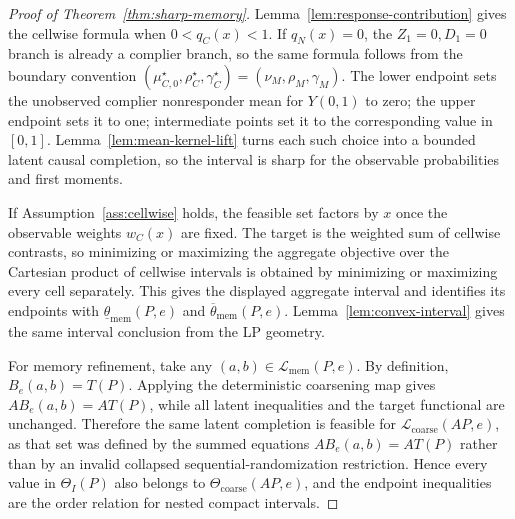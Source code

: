 \documentclass[11pt]{article}
\theoremstyle{definition}
\theoremstyle{plain}
\theoremstyle{remark}
\begin{document}
\begin{proof}[Proof of Theorem~\ref{thm:sharp-memory}]
Lemma~\ref{lem:response-contribution} gives the cellwise formula when \(0<q_C(x)<1\).  If \(q_N(x)=0\), the \(Z_1=0,D_1=0\) branch is already a complier branch, so the same formula follows from the boundary convention \((\mu_{C,0}^{\star},\rho_C^{\star},\gamma_C^{\star})=(\nu_M,\rho_M,\gamma_M)\).  The lower endpoint sets the unobserved complier nonresponder mean for \(Y(0,1)\) to zero; the upper endpoint sets it to one; intermediate points set it to the corresponding value in \([0,1]\).  Lemma~\ref{lem:mean-kernel-lift} turns each such choice into a bounded latent causal completion, so the interval is sharp for the observable probabilities and first moments.

If Assumption~\ref{ass:cellwise} holds, the feasible set factors by \(x\) once the observable weights \(w_C(x)\) are fixed.  The target is the weighted sum of cellwise contrasts, so minimizing or maximizing the aggregate objective over the Cartesian product of cellwise intervals is obtained by minimizing or maximizing every cell separately.  This gives the displayed aggregate interval and identifies its endpoints with \(\underline\theta_{\mathrm{mem}}(P,e)\) and \(\overline\theta_{\mathrm{mem}}(P,e)\).  Lemma~\ref{lem:convex-interval} gives the same interval conclusion from the LP geometry.

For memory refinement, take any \((a,b)\in\mathcal L_{\mathrm{mem}}(P,e)\).  By definition, \(B_e(a,b)=T(P)\).  Applying the deterministic coarsening map gives \(A B_e(a,b)=A T(P)\), while all latent inequalities and the target functional are unchanged.  Therefore the same latent completion is feasible for \(\mathcal L_{\mathrm{coarse}}(A P,e)\), as that set was defined by the summed equations \(A B_e(a,b)=A T(P)\) rather than by an invalid collapsed sequential-randomization restriction.  Hence every value in \(\Theta_I(P)\) also belongs to \(\Theta_{\mathrm{coarse}}(A P,e)\), and the endpoint inequalities are the order relation for nested compact intervals.
\end{proof}
\end{document}
